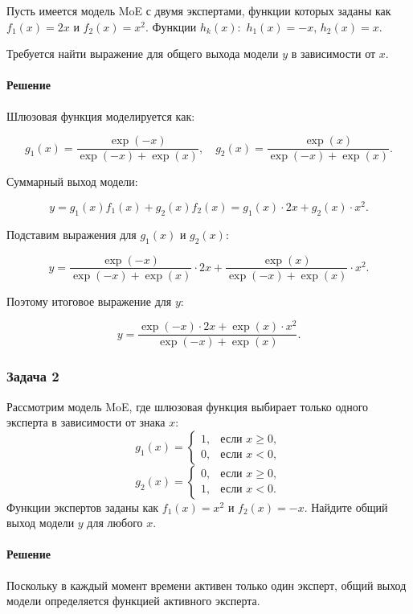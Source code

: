 Пусть имеется модель MoE с двумя экспертами, функции которых заданы как $f_1(x) = 2x$ и $f_2(x) = x^2$. Функции $h_k (x):$ $h_1 (x) = -x$, $h_2 (x) = x$.

Требуется найти выражение для общего выхода модели $y$ в зависимости от $x$.

\paragraph{Решение}

Шлюзовая функция моделируется как:

$$
g_1(x) = \frac{\exp(-x)}{\exp(-x) + \exp(x)}, \quad g_2(x) = \frac{\exp(x)}{\exp(-x) + \exp(x)}.
$$

Суммарный выход модели:

$$
y = g_1(x) f_1(x) + g_2(x) f_2(x) = g_1(x) \cdot 2x + g_2(x) \cdot x^2.
$$

Подставим выражения для $g_1(x)$ и $g_2(x)$:

$$
y = \frac{\exp(-x)}{\exp(-x) + \exp(x)} \cdot 2x + \frac{\exp(x)}{\exp(-x) + \exp(x)} \cdot x^2.
$$

Поэтому итоговое выражение для $y$:

$$
y = \frac{\exp(-x) \cdot 2x + \exp(x) \cdot x^2}{\exp(-x) + \exp(x)}.
$$

\subsubsection{Задача 2}

Рассмотрим модель MoE, где шлюзовая функция выбирает только одного эксперта в зависимости от знака $x$:
$$
g_1(x) = 
\begin{cases} 
1, & \text{если } x \geq 0, \\ 
0, & \text{если } x < 0,
\end{cases}
$$
$$
g_2(x) = 
\begin{cases} 
0, & \text{если } x \geq 0, \\ 
1, & \text{если } x < 0.
\end{cases}
$$
Функции экспертов заданы как $f_1(x) = x^2$ и $f_2(x) = -x$. Найдите общий выход модели $y$ для любого $x$.

\paragraph{Решение}

Поскольку в каждый момент времени активен только один эксперт, общий выход модели определяется функцией активного эксперта.

